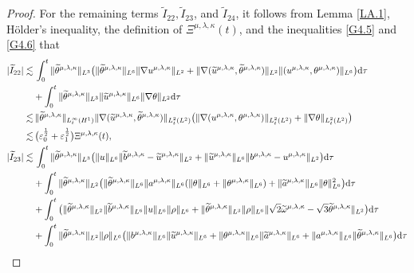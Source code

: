 \documentclass[reqno,11pt]{amsart}
\theoremstyle{plain}
\numberwithin{equation}{section}
\newcommand{\eps}{{\varepsilon}}
\begin{document}
\begin{proof}
For the remaining terms $\widetilde{I}_{22}, \widetilde{I}_{23}$, and $\widetilde{I}_{24}$, 
it follows from Lemma \ref{LA.1},  H\"{o}lder's inequality, the definition of ${\Xi} ^{\mu,\lambda,\kappa}(t)$, and the inequalities \eqref{G4.5} and \eqref{G4.6} that
\begin{align}
|\widetilde{I}_{22}|\lesssim&\, \int_0^t \|\widetilde{\theta}^{\mu,\lambda,\kappa}\|_{L^3}\big(\|\widetilde{\theta}^{\mu,\lambda,\kappa}\|_{L^6}\|\nabla u^{\mu,\lambda,\kappa}\|_{L^2}+ \|\nabla(\widetilde{u}^{\mu,\lambda,\kappa},\widetilde{\theta}^{\mu,\lambda,\kappa})\|_{L^2}\|(u^{\mu,\lambda,\kappa},\theta^{\mu,\lambda,\kappa})\|_{L^6}\big){\rm d}\tau   \nonumber\\
&+\int_0^t \|\widetilde{\theta}^{\mu,\lambda,\kappa}\|_{L^3}\|\widetilde{u}^{\mu,\lambda,\kappa}\|_{L^6}\|\nabla\theta\|_{L^2}{\rm d}\tau\nonumber\\
\lesssim&\, \|\widetilde{\theta}^{\mu,\lambda,\kappa}\|_{L_t^\infty(H^1)} \|\nabla(\widetilde{u}^{\mu,\lambda,\kappa},\widetilde{\theta}^{\mu,\lambda,\kappa})\|_{L_t^2(L^2)}\big(\|\nabla(u^{\mu,\lambda,\kappa},\theta^{\mu,\lambda,\kappa})\|_{L_t^2(L^2)}+\|\nabla \theta \|_{L_t^2(L^2)}\big)\nonumber\\
\lesssim&\,\big(\eps_0^\frac{1}{2}+\eps_1^\frac{1}{2}\big){\Xi} ^{\mu,\lambda,\kappa}(t),\label{G4.15-1}\\
|\widetilde{I}_{23}|\lesssim&\, \int_0^t \|\widetilde{\theta}^{\mu,\lambda,\kappa}\|_{L^3}\big(\|{u}\|_{L^6}\|\widetilde{b}^{\mu,\lambda,\kappa}-\widetilde{u}^{\mu,\lambda,\kappa}\|_{L^2}+\|\widetilde{u}^{\mu,\lambda,\kappa}\|_{L^6}\| {b}^{\mu,\lambda,\kappa}- {u}^{\mu,\lambda,\kappa} \|_{L^2}\big){\rm d}\tau\nonumber\\
&+\int_0^t \|\widetilde{\theta}^{\mu,\lambda,\kappa}\|_{L^2}\big(\|\widetilde{\theta}^{\mu,\lambda,\kappa}\|_{L^6}\|a^{\mu,\lambda,\kappa}\|_{L^6}(\|\theta\|_{L^6}+\|\theta^{\mu,\lambda,\kappa}\|_{L^6})+\|  \widetilde{a}^{\mu,\lambda,\kappa}\|_{L^6}\| \theta\|_{L^6}^2\big){\rm d}\tau\nonumber\\
&+ \int_0^t  \big(\|\widetilde{\theta}^{\mu,\lambda,\kappa}\|_{L^2}\|\widetilde{b}^{\mu,\lambda,\kappa}\|_{L^6}\|u\|_{L^6}\|\rho\|_{L^6}+\|\widetilde{\theta}^{\mu,\lambda,\kappa}\|_{L^3}\|\rho\|_{L^6} \|\sqrt{2}\widetilde{\omega}^{\mu,\lambda,\kappa}-\sqrt{3}\widetilde{\theta}^{\mu,\lambda,\kappa}\|_{L^2}\big)  {\rm d}\tau \nonumber\\
&+\int_0^t\|\widetilde{\theta}^{\mu,\lambda,\kappa}\|_{L^2}\|\rho\|_{L^6}\big(\|b^{\mu,\lambda,\kappa}\|_{L^6}\|\widetilde{u}^{\mu,\lambda,\kappa}\|_{L^6}+\|\theta^{\mu,\lambda,\kappa}\|_{L^6}\|\widetilde{a}^{\mu,\lambda,\kappa}\|_{L^6}+\|a^{\mu,\lambda,\kappa}\|_{L^6}\|\widetilde{\theta}^{\mu,\lambda,\kappa}\|_{L^6}\big){\rm d}\tau \nonumber\\

\end{align}
\end{proof}
\end{document}
